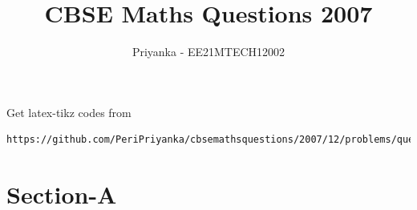 \documentclass[journal,12pt,twocolumn]{IEEEtran}
\begin{document}
     \def\rightbox#1{\makebox[0in][r]{#1}}
     \def\centbox#1{\makebox[0in]{#1}}
     \def\topbox#1{\raisebox{-\baselineskip}[0in][0in]{#1}}
     \def\midbox#1{\raisebox{-0.5\baselineskip}[0in][0in]{#1}}
\vspace{3cm}
\title{CBSE Maths Questions 2007}
\author{Priyanka - EE21MTECH12002}
\maketitle
\newpage
\bigskip
\renewcommand{\thefigure}{\theenumi}
\renewcommand{\thetable}{\theenumi}
%
Get latex-tikz codes from 
%
\begin{lstlisting}
https://github.com/PeriPriyanka/cbsemathsquestions/2007/12/problems/questions
\end{lstlisting}
\section{Section-A}
\end{document}
